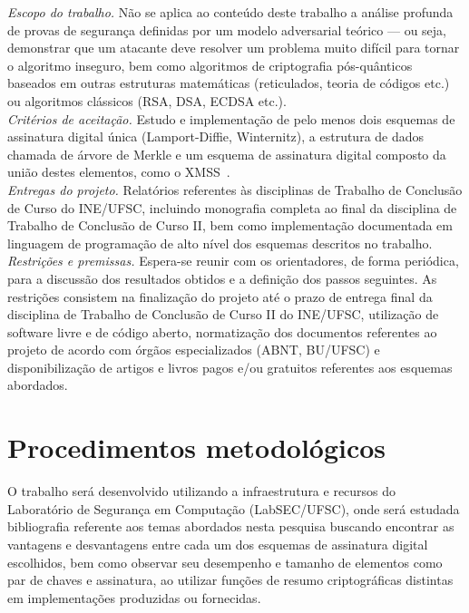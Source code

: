 \documentclass{ufsctex/ufsctex}
\begin{document}
\noindent \emph{Escopo do trabalho.} Não se aplica ao conteúdo deste trabalho
a análise profunda de provas de segurança definidas por um modelo adversarial
teórico --- ou seja, demonstrar que um atacante deve resolver um problema muito
difícil para tornar o algoritmo inseguro, bem como algoritmos de criptografia
pós-quânticos baseados em outras estruturas matemáticas (reticulados, teoria
de códigos etc.) ou algoritmos clássicos (RSA, DSA, ECDSA etc.). \\

\noindent \emph{Critérios de aceitação.} Estudo e implementação de pelo menos
dois esquemas de assinatura digital única (Lamport-Diffie, Winternitz),
a estrutura de dados chamada de árvore de Merkle e um esquema de assinatura
digital composto da união destes elementos, como o
XMSS~\cite{Buchmann:2011:XPF:2184003.2184011}. \\

\noindent \emph{Entregas do projeto.} Relatórios referentes às disciplinas de
Trabalho de Conclusão de Curso do INE/UFSC, incluindo monografia completa ao
final da disciplina de Trabalho de Conclusão de Curso II, bem como
implementação documentada em linguagem de programação de alto nível dos
esquemas descritos no trabalho. \\

\noindent \emph{Restrições e premissas.} Espera-se reunir com os orientadores,
de forma periódica, para a discussão dos resultados obtidos e a definição dos
passos seguintes. As restrições consistem na finalização do projeto até o prazo
de entrega final da disciplina de Trabalho de Conclusão de Curso II do
INE/UFSC, utilização de software livre e de código aberto, normatização dos
documentos referentes ao projeto de acordo com órgãos especializados (ABNT,
BU/UFSC) e disponibilização de artigos e livros pagos e/ou gratuitos referentes
aos esquemas abordados.

\section{Procedimentos metodológicos}

O trabalho será desenvolvido utilizando a infraestrutura e recursos do
Laboratório de Segurança em Computação (LabSEC/UFSC), onde será estudada
bibliografia referente aos temas abordados nesta pesquisa buscando encontrar
as vantagens e desvantagens entre cada um dos esquemas de assinatura digital
escolhidos, bem como observar seu desempenho e tamanho de elementos como
par de chaves e assinatura, ao utilizar funções de resumo criptográficas
distintas em implementações produzidas ou fornecidas.
\end{document}
